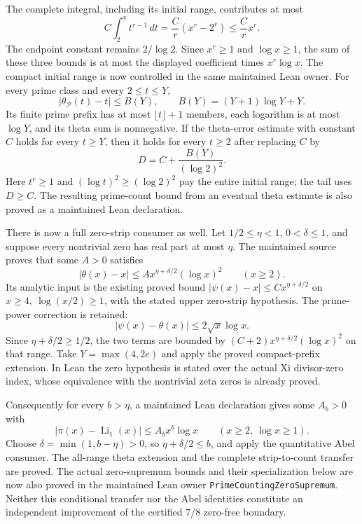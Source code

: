 \documentclass[11pt]{article}
\theoremstyle{definition}
\begin{document}
The complete integral, including its initial range, contributes at most
\[
 C\int_2^x t^{r-1}\,dt
 =\frac Cr(x^r-2^r)\le\frac Cr x^r.
\]
The endpoint constant remains \(2/\log2\).
Since \(x^r\ge1\) and \(\log x\ge1\), the sum of these three
bounds is at most the displayed coefficient times \(x^r\log x\).
The compact initial range is now controlled in the same maintained Lean
owner. For every prime class and every \(2\le t\le Y\),
\[
 |\theta_{\mathcal P}(t)-t|\le B(Y),\qquad
 B(Y)=(Y+1)\log Y+Y.
\]
Its finite prime prefix has at most \(\lfloor t\rfloor+1\)
members, each logarithm is at most \(\log Y\), and its theta sum
is nonnegative. If the theta-error estimate with constant \(C\)
holds for every \(t\ge Y\), then it holds for every \(t\ge2\)
after replacing \(C\) by
\[
 D=C+\frac{B(Y)}{(\log2)^2}.
\]
Here \(t^r\ge1\) and \((\log t)^2\ge(\log2)^2\) pay the entire
initial range; the tail uses \(D\ge C\).
The resulting prime-count bound from an eventual theta estimate
is also proved as a maintained Lean declaration.

There is now a full zero-strip consumer as well. Let
\(1/2\le\eta<1\), \(0<\delta\le1\), and suppose every nontrivial
zero has real part at most \(\eta\). The maintained source proves
that some \(A>0\) satisfies
\[
 |\theta(x)-x|
 \le A x^{\eta+\delta/2}(\log x)^2\qquad(x\ge2).
\]
Its analytic input is the existing proved bound
\(|\psi(x)-x|\le Cx^{\eta+\delta/2}\) on
\(x\ge4,\ \log(x/2)\ge1\), with the stated upper zero-strip
hypothesis. The prime-power correction is retained:
\[
 |\psi(x)-\theta(x)|\le2\sqrt{x}\log x.
\]
Since \(\eta+\delta/2\ge1/2\), the two terms are bounded by
\((C+2)x^{\eta+\delta/2}(\log x)^2\) on that range.
Take \(Y=\max(4,2e)\) and apply the proved compact-prefix extension.
In Lean the zero hypothesis is stated over the actual Xi divisor-zero
index, whose equivalence with the nontrivial zeta zeros is already proved.

Consequently for every \(b>\eta\), a maintained Lean declaration gives
some \(A_b>0\) with
\[
 |\pi(x)-\operatorname{Li}_1(x)|\le A_bx^b\log x
 \qquad(x\ge2,\ \log x\ge1).
\]
Choose \(\delta=\min(1,b-\eta)>0\), so
\(\eta+\delta/2\le b\), and apply the quantitative Abel consumer.
The all-range theta extension and the complete strip-to-count transfer
are proved. The actual zero-supremum bounds and their specialization
below are now also proved in the maintained Lean owner
\texttt{PrimeCountingZeroSupremum}.
Neither this conditional transfer nor the Abel identities constitute
an independent improvement of the certified \(7/8\) zero-free boundary.
\end{document}
